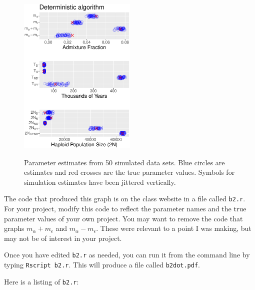 \documentclass[11pt]{article}
\begin{document}
\begin{figure}
  {\centering\includegraphics[width=0.5\textwidth]{det-msp-dot.pdf}\\}
  \caption{Parameter estimates from 50 simulated data sets. Blue
    circles are estimates and red crosses are the true parameter
    values. Symbols for simulation estimates have been jittered
    vertically.}
  \label{fig.dot}
\end{figure}

The code that produced this graph is on the class website in a file
called \texttt{b2.r}. For your project, modify this code to reflect
the parameter names and the true parameter values of your own
project. You may want to remove the code that graphs $m_\alpha +
m_\epsilon$ and $m_\alpha - m_\epsilon$. These were relevant to a
point I was making, but may not be of interest in your project.

Once you have edited \texttt{b2.r} as needed, you can run it from the
command line by typing \texttt{Rscript b2.r}. This will produce a file
called \texttt{b2dot.pdf}.

Here is a listing of \texttt{b2.r}:


\printbibliography
\end{document}
